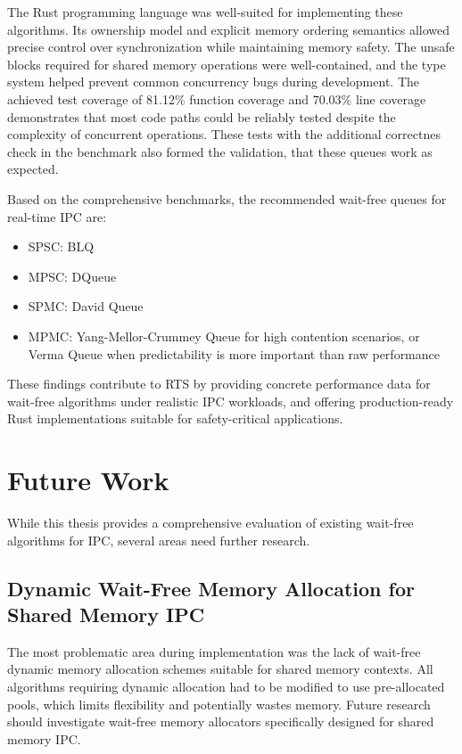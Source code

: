 The Rust programming language was well-suited for implementing these algorithms. Its ownership model and explicit memory ordering semantics allowed precise control over synchronization while maintaining memory safety. The unsafe blocks required for shared memory operations were well-contained, and the type system helped prevent common concurrency bugs during development. The achieved test coverage of 81.12\% function coverage and 70.03\% line coverage demonstrates that most code paths could be reliably tested despite the complexity of concurrent operations. These tests with the additional correctnes check in the benchmark also formed the validation, that these queues work as expected.

Based on the comprehensive benchmarks, the recommended wait-free queues for real-time IPC are:
\begin{itemize}
\item \ac{SPSC}: \acf{BLQ}
\item \ac{MPSC}: DQueue
\item \ac{SPMC}: David Queue
\item \ac{MPMC}: Yang-Mellor-Crummey Queue for high contention scenarios, or Verma Queue when predictability is more important than raw performance
\end{itemize}

These findings contribute to \ac{RTS} by providing concrete performance data for wait-free algorithms under realistic \ac{IPC} workloads, and offering production-ready Rust implementations suitable for safety-critical applications.

\section{Future Work}
While this thesis provides a comprehensive evaluation of existing wait-free algorithms for \ac{IPC}, several areas need further research.

\subsection{Dynamic Wait-Free Memory Allocation for Shared Memory \acf{IPC}}
The most problematic area during implementation was the lack of wait-free dynamic memory allocation schemes suitable for shared memory contexts. All algorithms requiring dynamic allocation had to be modified to use pre-allocated pools, which limits flexibility and potentially wastes memory. Future research should investigate wait-free memory allocators specifically designed for shared memory \ac{IPC}.


